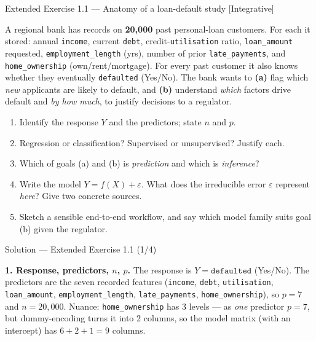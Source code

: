 \documentclass[aspectratio=169,11pt]{beamer}
\begin{document}
\begin{frame}{Extended Exercise 1.1 --- Anatomy of a loan-default study [Integrative]}
\begin{longexercise}
A regional bank has records on \textbf{20{,}000} past personal-loan customers. For each it stored: annual \texttt{income}, current \texttt{debt}, credit-\texttt{utilisation} ratio, \texttt{loan\_amount} requested, \texttt{employment\_length} (yrs), number of prior \texttt{late\_payments}, and \texttt{home\_ownership} (own/rent/mortgage). For every past customer it also knows whether they eventually \texttt{defaulted} (Yes/No). The bank wants to \textbf{(a)} flag which \emph{new} applicants are likely to default, and \textbf{(b)} understand \emph{which} factors drive default and \emph{by how much}, to justify decisions to a regulator.
\begin{enumerate}\setlength\itemsep{1pt}
  \item Identify the response $Y$ and the predictors; state $n$ and $p$.
  \item Regression or classification? Supervised or unsupervised? Justify each.
  \item Which of goals (a) and (b) is \emph{prediction} and which is \emph{inference}?
  \item Write the model $Y=f(X)+\varepsilon$. What does the irreducible error $\varepsilon$ represent \emph{here}? Give two concrete sources.
  \item Sketch a sensible end-to-end workflow, and say which model family suits goal (b) given the regulator.
\end{enumerate}
\end{longexercise}
\end{frame}

\begin{frame}{Solution --- Extended Exercise 1.1 (1/4)}
\begin{solutionbox}
\textbf{1. Response, predictors, $n$, $p$.} The response is $Y=\texttt{defaulted}$ (Yes/No). The predictors are the seven recorded features (\texttt{income}, \texttt{debt}, \texttt{utilisation}, \texttt{loan\_amount}, \texttt{employment\_length}, \texttt{late\_payments}, \texttt{home\_ownership}), so $p=7$ and $n=20{,}000$. Nuance: \texttt{home\_ownership} has 3 levels --- as \emph{one} predictor $p=7$, but dummy-encoding turns it into 2 columns, so the model matrix (with an intercept) has $6+2+1=9$ columns.
\end{solutionbox}
\end{frame}
\end{document}
